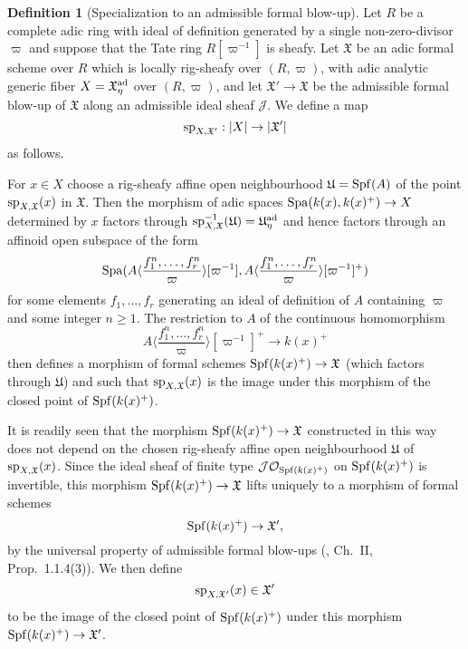 \documentclass[12pt,twoside,a4paper]{article}
\theoremstyle{definition}
\newtheorem{mydef}[thm]{Definition}
\theoremstyle{remark}
\newcommand\ad{{\rm ad}}
\newcommand\spc{{\rm sp}}
\newcommand\Spa{{\rm Spa}}
\newcommand\Spf{{\rm Spf}}
\begin{document}
\begin{mydef}[Specialization to an admissible formal blow-up]\label{Specialization to an admissible formal blow-up}Let $R$ be a complete adic ring with ideal of definition generated by a single non-zero-divisor $\varpi$ and suppose that the Tate ring $R[\varpi^{-1}]$ is sheafy. Let $\mathfrak{X}$ be an adic formal scheme over $R$ which is locally rig-sheafy over $(R, \varpi)$, with adic analytic generic fiber $X=\mathfrak{X}_{\eta}^{\ad}$ over $(R, \varpi)$, and let $\mathfrak{X}'\to \mathfrak{X}$ be the admissible formal blow-up of $\mathfrak{X}$ along an admissible ideal sheaf $\mathcal{J}$. We define a map \begin{equation*}\spc_{X,\mathfrak{X}'}: \vert X\vert\to \vert\mathfrak{X}'\vert\end{equation*}as follows. 

For $x\in X$ choose a rig-sheafy affine open neighbourhood $\mathfrak{U}=\Spf(A)$ of the point $\spc_{X,\mathfrak{X}}(x)$ in $\mathfrak{X}$. Then the morphism of adic spaces $\Spa(k(x), k(x)^{+})\to X$ determined by $x$ factors through $\spc_{X,\mathfrak{X}}^{-1}(\mathfrak{U})=\mathfrak{U}_{\eta}^{\ad}$ and hence factors through an affinoid open subspace of the form \begin{equation*}\Spa(A\langle\frac{f_1^{n},\dots, f_r^{n}}{\varpi}\rangle[\varpi^{-1}], A\langle\frac{f_1^{n},\dots,f_r^{n}}{\varpi}\rangle[\varpi^{-1}]^{+})\end{equation*}for some elements $f_1,\dots, f_r$ generating an ideal of definition of $A$ containing $\varpi$ and some integer $n\geq1$. The restriction to $A$ of the continuous homomorphism \begin{equation*}A\langle\frac{f_1^{n},\dots,f_r^{n}}{\varpi}\rangle[\varpi^{-1}]^{+}\to k(x)^{+}\end{equation*}then defines a morphism of formal schemes $\Spf(k(x)^{+})\to \mathfrak{X}$ (which factors through $\mathfrak{U}$) and such that $\spc_{X,\mathfrak{X}}(x)$ is the image under this morphism of the closed point of $\Spf(k(x)^{+})$. 

It is readily seen that the morphism $\Spf(k(x)^{+})\to \mathfrak{X}$ constructed in this way does not depend on the chosen rig-sheafy affine open neighbourhood $\mathfrak{U}$ of $\spc_{X,\mathfrak{X}}(x)$. Since the ideal sheaf of finite type $\mathcal{J}\mathcal{O}_{\Spf(k(x)^{+})}$ on $\Spf(k(x)^{+})$ is invertible, this morphism $\Spf(k(x)^{+})\to \mathfrak{X}$ lifts uniquely to a morphism of formal schemes \begin{equation*}\Spf(k(x)^{+})\to \mathfrak{X}',\end{equation*}by the universal property of admissible formal blow-ups (\cite{FK}, Ch.~II, Prop.~1.1.4(3)). We then define \begin{equation*}\spc_{X,\mathfrak{X}'}(x)\in\mathfrak{X}'\end{equation*}to be the image of the closed point of $\Spf(k(x)^{+})$ under this morphism $\Spf(k(x)^{+})\to \mathfrak{X}'$.\end{mydef}
\end{document}
